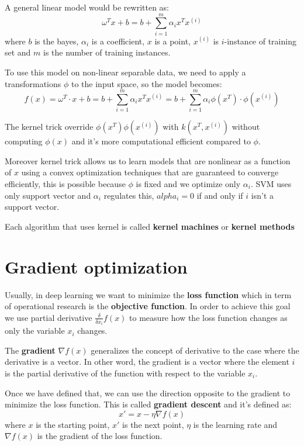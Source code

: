 A general linear model would be rewritten as:
\begin{equation}
    \omega^T x + b = b+ \sum_{i=1}^m \alpha_ix^Tx^{(i)}
\end{equation}
where $b$ is the bayes, $\alpha_i$ is a coefficient, $x$ is a point, $x^(i)$ is
$i$-instance of training set and $m$ is the number of training instances.

To use this model on non-linear separable data, we need to apply a transformations $\phi$
to the input space, so the model becomes:
\begin{equation}
    f(x) = \omega^T \cdot x + b = b + \sum_{i = 1}^m \alpha_ix^Tx^{(i)} = b +
    \sum_{i=1}^m \alpha_i\phi (x^T) \cdot \phi(x^{(i)})
\end{equation}

The kernel trick override $\phi(x^T)\phi(x^{(i)})$ with $k(x^T, x^{(i)})$ without
computing $\phi(x)$ and it's more computational efficient compared to $\phi$.

Moreover kernel trick allows us to learn models that are nonlinear as a function
of $x$ using a convex optimization techniques that are guaranteed to converge
efficiently, this is possible because $\phi $ is fixed and we optimize only $\alpha_i$.
SVM uses only support vector and $\alpha_i$ regulates this, $alpha_i= 0$ if and
only if $i$ isn't a support vector.

Each algorithm that uses kernel is called \textbf{kernel machines} or \textbf{kernel
    methods}
\section{Gradient optimization}
Usually, in deep learning we want to minimize the \textbf{loss function} which in
term of operational research is the \textbf{objective function}. In order to
achieve this goal we use partial derivative $\frac{\delta}{\delta x_i} f(x)$ to
measure how the loss function changes as only the variable $x_i$ changes.

The \textbf{gradient} $\nabla f(x)$ generalizes the concept of derivative to the
case where the derivative is a vector. In other word, the gradient is a vector
where the element $i$ is the partial derivative of the function with respect to
the variable $x_i$.

Once we have defined that, we can use the direction opposite to the gradient to
minimize the loss function. This is called \textbf{gradient descent} and it's
defined as:
\begin{equation}
    x' = x - \eta \nabla f(x)
\end{equation}
where $x$ is the starting point, $x'$ is the next point, $\eta$ is the learning
rate and $\nabla f(x)$ is the gradient of the loss function.


